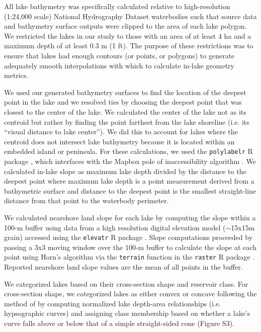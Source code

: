 \documentclass[draft]{agujournal2019}
\begin{document}
All lake bathymetry was specifically calculated relative to high-resolution (1:24,000 scale) National Hydrography Dataset \cite{usgsNationalHydrographyDataset2019} waterbodies such that source data and bathymetry surface outputs were clipped to the area of each lake polygon. We restricted the lakes in our study to those with an area of at least 4 ha and a maximum depth of at least 0.3 m (1 ft). The purpose of these restrictions was to ensure that lakes had enough contours (or points, or polygons) to generate adequately smooth interpolations with which to calculate in-lake geometry metrics.

We used our generated bathymetry surfaces to find the location of the deepest point in the lake and we resolved ties by choosing the deepest point that was closest to the center of the lake. We calculated the center of the lake not as its centroid but rather by finding the point farthest from the lake shoreline (i.e. its “visual distance to lake center”). We did this to account for lakes where the centroid does not intersect lake bathymetry because it is located within an embedded island or peninsula. For these calculations, we used the \texttt{polylabelr} R package \cite{larssonPolylabelrFindPole2019}, which interfaces with the Mapbox pole of inaccessibility algorithm \cite{agafonkinJSLibraryFinding2019}. We calculated in-lake slope as maximum lake depth divided by the distance to the deepest point where maximum lake depth is a point measurement derived from a bathymetric surface and distance to the deepest point is the smallest straight-line distance from that point to the waterbody perimeter.

We calculated nearshore land slope for each lake by computing the slope within a 100-m buffer using data from a high resolution digital elevation model ($\sim$15x15m grain) accessed using the \texttt{elevatr} R package \cite{hollisterElevatrAccessElevation2017}. Slope computations proceeded by passing a 3x3 moving window over the 100-m buffer to calculate the slope at each point using Horn's algorithm via the \texttt{terrain} function in the \texttt{raster} R package \cite{hijmansRasterGeographicData2019}. Reported nearshore land slope values are the mean of all points in the buffer.

We categorized lakes based on their cross-section shape and reservoir class. For cross-section shape, we categorized lakes as either convex or concave following the method of  by computing normalized lake depth-area relationships (i.e. hypsographic curves) and assigning class membership based on whether a lake’s curve falls above or below that of a simple straight-sided cone (Figure S3).
\end{document}
